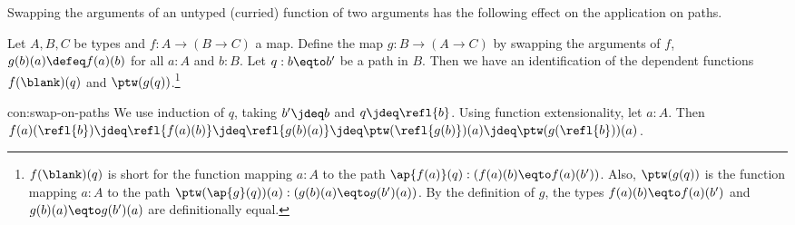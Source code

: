 Swapping the arguments
of an untyped (curried) function of two arguments has
the following effect on the application on paths.

\begin{construction}\label{con:swap-on-paths}
Let $A,B,C$ be types and $f:A\to(B\to C)$ a map.
Define the map $g:B\to(A\to C)$ by swapping the arguments of $f$,
\ie $g(b)(a)\defeq f(a)(b)$ for all $a:A$ and $b:B$. 
Let $q:b\eqto b'$ be a path in $B$. 
Then we have an identification of the dependent functions
$f(\blank)(q)$ and $\ptw(g(q))$.\footnote{%
$f(\blank)(q)$ is short for the function mapping $a:A$ to the
path $\ap{f(a)}(q): (f(a)(b)\eqto f(a)(b'))$.
Also, $\ptw(g(q))$ is the function mapping $a:A$ to the path
$\ptw(\ap{g}(q))(a): (g(b)(a) \eqto g(b')(a))$.
By the definition of $g$, the types $f(a)(b)\eqto f(a)(b')$
and $g(b)(a) \eqto g(b')(a)$ are definitionally equal.}  
\end{construction}
\begin{implementation}{con:swap-on-paths}
We use induction of $q$, taking $b'\jdeq b$ and $q\jdeq\refl{b}$.
Using function extensionality, let $a:A$.
Then $f(a)(\refl{b})\jdeq\refl{f(a)(b)}\jdeq\refl{g(b)(a)}
\jdeq\ptw(\refl{g(b)})(a)\jdeq\ptw(g(\refl{b}))(a)$.
\end{implementation}

